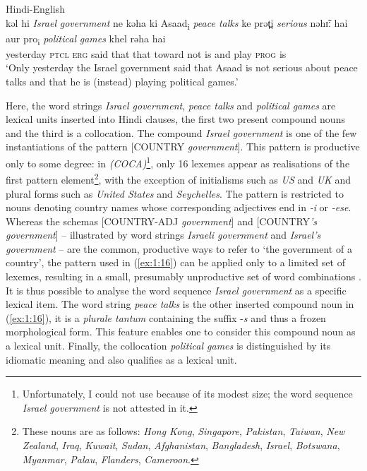 \ea \label{ex:1:16}
Hindi-English \citep[228]{bhatt-1997}\\
\gll kəl hi \textit{Israel} \textit{government} ne kəha ki Asaad\textsubscript{i} \textit{peace talks} ke prət̪i \textit{serious} nəhɪ̃ː hai aur pro\textsubscript{i} \textit{political} \textit{games} khel rəha hai\\
yesterday \textsc{ptcl} {} {} \textsc{erg} said that {} {} that toward {} not is and {} {} {} play \textsc{prog} is\\
\glt `Only yesterday the Israel government said that Asaad is not serious about peace talks and that he is (instead) playing political games.'
\z

\noindent Here, the word strings \textit{Israel government}, \textit{peace talks} and \textit{political games} are lexical units inserted into Hindi clauses, the first two present compound nouns and the third is a collocation. The compound \textit{Israel government} is one of the few instantiations of the pattern [COUNTRY \textit{government}]. This pattern is productive only to some degree: in  \textit{(COCA)}\footnote{Unfortunately, I could not use  because of its modest size; the word sequence \textit{Israel government} is not attested in it.
}, only 16 lexemes appear as realisations of the first pattern element\footnote{These nouns are as follows: \textit{Hong Kong}, \textit{Singapore}, \textit{Pakistan}, \textit{Taiwan}, \textit{New Zealand}, \textit{Iraq}, \textit{Kuwait}, \textit{Sudan}, \textit{Afghanistan}, \textit{Bangladesh}, \textit{Israel}, \textit{Botswana}, \textit{Myanmar}, \textit{Palau}, \textit{Flanders}, \textit{Cameroon}.
}, with the exception of initialisms such as \textit{US} and \textit{UK} and plural forms such as \textit{United States} and \textit{Seychelles}. The pattern is restricted to nouns denoting country names whose corresponding adjectives end in \textit{-i} or \textit{-ese}. Whereas the schemas [\MakeUppercase{country-adj} \textit{government}] and [\MakeUppercase{country}\textit{'s government}] -- illustrated by word strings \textit{Israeli government} and \textit{Israel's government} -- are the common, productive ways to refer to `the government of a country', the pattern used in (\ref{ex:1:16}) can be applied only to a limited set of lexemes, resulting in a small, presumably unproductive set of word combinations \citep[cf.][74]{bauer01}. It is thus possible to analyse the word sequence \textit{Israel government} as a specific lexical item. The word string \textit{peace talks} is the other inserted compound noun in (\ref{ex:1:16}), it is a \textit{plurale tantum} containing the suffix -\textit{s} and thus a frozen morphological form. This feature enables one to consider this compound noun as a lexical unit. Finally, the collocation \textit{political games} is distinguished by its idiomatic meaning and also qualifies as a lexical unit.

